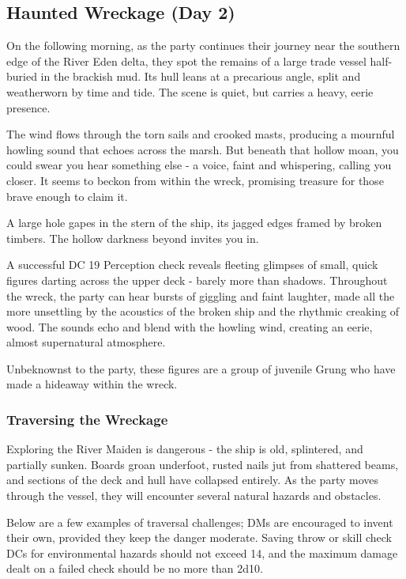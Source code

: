 \subsection*{Haunted Wreckage (Day 2)}
{\entryfont On the following morning, as the party continues their journey near the southern edge of the River Eden delta, they spot the remains of a large trade vessel half-buried in the brackish mud. Its hull leans at a precarious angle, split and weatherworn by time and tide. The scene is quiet, but carries a heavy, eerie presence.}

\begin{DndReadAloud}
	The wind flows through the torn sails and crooked masts, producing a mournful howling sound that echoes across the marsh. But beneath that hollow moan, you could swear you hear something else - a voice, faint and whispering, calling you closer. It seems to beckon from within the wreck, promising treasure for those brave enough to claim it.

	A large hole gapes in the stern of the ship, its jagged edges framed by broken timbers. The hollow darkness beyond invites you in.
\end{DndReadAloud}

{\entryfont\noindent A successful DC 19 Perception check reveals fleeting glimpses of small, quick figures darting across the upper deck - barely more than shadows. Throughout the wreck, the party can hear bursts of giggling and faint laughter, made all the more unsettling by the acoustics of the broken ship and the rhythmic creaking of wood. The sounds echo and blend with the howling wind, creating an eerie, almost supernatural atmosphere.

Unbeknownst to the party, these figures are a group of juvenile Grung who have made a hideaway within the wreck.}

\subsubsection*{Traversing the Wreckage}
{\entryfont\noindent Exploring the River Maiden is dangerous - the ship is old, splintered, and partially sunken. Boards groan underfoot, rusted nails jut from shattered beams, and sections of the deck and hull have collapsed entirely. As the party moves through the vessel, they will encounter several natural hazards and obstacles.

Below are a few examples of traversal challenges; DMs are encouraged to invent their own, provided they keep the danger moderate. Saving throw or skill check DCs for environmental hazards should not exceed 14, and the maximum damage dealt on a failed check should be no more than 2d10.}

